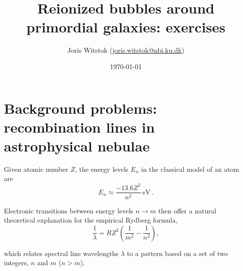 \documentclass{article}
\title{Reionized bubbles around primordial galaxies: exercises}
\author{Joris Witstok (\href{mailto:joris.witstok@nbi.ku.dk}{joris.witstok@nbi.ku.dk})}
\date{\today}
\theoremstyle{definition}
\begin{document}
\maketitle

\section{Background problems: recombination lines in astrophysical nebulae}

Given atomic number $Z$, the energy levels $E_n$ in the classical \citet{1913PMag...26....1B} model of an atom are
\begin{equation}
    \label{eq:Atomic_energy_levels}
    E_n \approx \frac{-13.6 Z^2}{n^2} \, \mathrm{eV} \, .
\end{equation}

\noindent Electronic transitions between energy levels $n \rightarrow m$ then offer a natural theoretical explanation for the empirical Rydberg formula,
\begin{equation}
    \label{eq:Rydberg_formula}
    \frac{1}{\lambda} = R Z^2 \left( \frac{1}{m^2} - \frac{1}{n^2} \right) ,
\end{equation}

\noindent which relates spectral line wavelengths $\lambda$ to a pattern based on a set of two integers, $n$ and $m$ ($n > m$).
\end{document}
